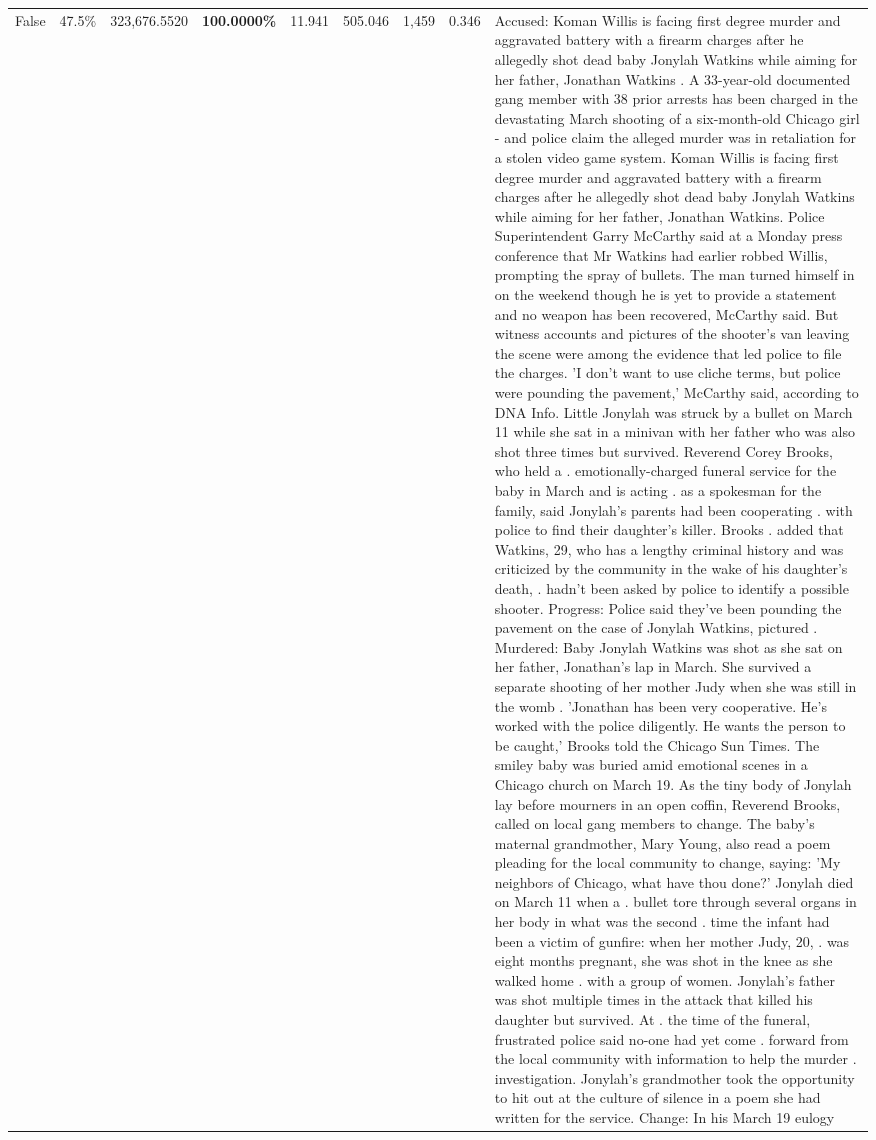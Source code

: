 \begin{table}[H]
\begin{tabular}{lllrlllll}
False & 47.5\% & 323,676.5520 & \bfseries \color{red} 100.0000\% & 11.941 & 505.046 & 1,459 & 0.346 & Accused: Koman Willis is facing first degree murder and aggravated battery with a firearm charges after he allegedly shot dead baby Jonylah Watkins while aiming for her father, Jonathan Watkins . A 33-year-old documented gang member with 38 prior arrests has been charged in the devastating March shooting of a six-month-old Chicago girl - and police claim the alleged murder was in retaliation for a stolen video game system. Koman Willis is facing first degree murder and aggravated battery with a firearm charges after he allegedly shot dead baby Jonylah Watkins while aiming for her father, Jonathan Watkins. Police Superintendent Garry McCarthy said at a Monday press conference that Mr Watkins had earlier robbed Willis, prompting the spray of bullets. The man turned himself in on the weekend though he is yet to provide a statement and no weapon has been recovered, McCarthy said. But witness accounts and pictures of the shooter's van leaving the scene were among the evidence that led police to file the charges. 'I don't want to use cliche terms, but police were pounding the pavement,' McCarthy said, according to DNA Info. Little Jonylah was struck by a bullet on March 11 while she sat in a minivan with her father who was also shot three times but survived. Reverend Corey Brooks, who held a . emotionally-charged funeral service for the baby in March and is acting . as a spokesman for the family, said Jonylah's parents had been cooperating . with police to find their daughter's killer. Brooks . added that Watkins, 29, who has a lengthy criminal history and was criticized by the community in the wake of his daughter's death, . hadn't been asked by police to identify a possible shooter. Progress: Police said they've been pounding the pavement on the case of Jonylah Watkins, pictured . Murdered: Baby Jonylah Watkins was shot as she sat on her father, Jonathan's lap in March. She survived a separate shooting of her mother Judy when she was still in the womb . 'Jonathan has been very cooperative. He's worked with the police diligently. He wants the person to be caught,' Brooks told the Chicago Sun Times. The smiley baby was buried amid emotional scenes in a Chicago church on March 19. As the tiny body of Jonylah lay before mourners in an open coffin, Reverend Brooks, called on local gang members to change. The baby's maternal grandmother, Mary Young, also read a poem pleading for the local community to change, saying: 'My neighbors of Chicago, what have thou done?' Jonylah died on March 11 when a . bullet tore through several organs in her body in what was the second . time the infant had been a victim of gunfire: when her mother Judy, 20, . was eight months pregnant, she was shot in the knee as she walked home . with a group of women. Jonylah's father was shot multiple times in the attack that killed his daughter but survived. At . the time of the funeral, frustrated police said no-one had yet come . forward from the local community with information to help the murder . investigation. Jonylah's grandmother took the opportunity to hit out at the culture of silence in a poem she had written for the service. Change: In his March 19 eulogy 
\end{tabular}
\end{table}
